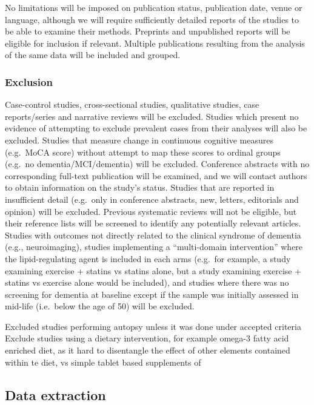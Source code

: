 \documentclass[a4paper, twoside]{templates/ociamthesis}
\begin{document}
No limitations will be imposed on publication status, publication date, venue or language, although we will require sufficiently detailed reports of the studies to be able to examine their methods. Preprints and unpublished reports will be eligible for inclusion if relevant. Multiple publications resulting from the analysis of the same data will be included and grouped.

\hypertarget{exclusion}{%
\subsubsection{Exclusion}\label{exclusion}}

Case-control studies, cross-sectional studies, qualitative studies, case reports/series and narrative reviews will be excluded. Studies which present no evidence of attempting to exclude prevalent cases from their analyses will also be excluded. Studies that measure change in continuous cognitive measures (e.g.~MoCA score) without attempt to map these scores to ordinal groups (e.g.~no dementia/MCI/dementia) will be excluded. Conference abstracts with no corresponding full-text publication will be examined, and we will contact authors to obtain information on the study's status. Studies that are reported in insufficient detail (e.g.~only in conference abstracts, new, letters, editorials and opinion) will be excluded. Previous systematic reviews will not be eligible, but their reference lists will be screened to identify any potentially relevant articles. Studies with outcomes not directly related to the clinical syndrome of dementia (e.g., neuroimaging), studies implementing a ``multi-domain intervention'' where the lipid-regulating agent is included in each arms (e.g.~for example, a study examining exercise + statins vs statins alone, but a study examining exercise + statins vs exercise alone would be included), and studies where there was no screening for dementia at baseline except if the sample was initially assessed in mid-life (i.e.~below the age of 50) will be excluded.

Excluded studies performing autopsy unless it was done under accepted criteria
Exclude studies using a dietary intervention, for example omega-3 fatty acid enriched diet, as it hard to disentangle the effect of other elements contained within te diet, vs simple tablet based supplements of

\hypertarget{data-extraction}{%
\subsection{Data extraction}\label{data-extraction}}
\end{document}
